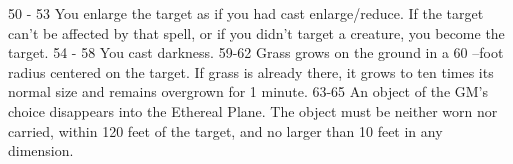 50 - 53                                           You enlarge the target as if you  had cast  enlarge/reduce. If the target can't be affected by  that spell, or if you didn't target a creature, you  become the target.                                                                                                                                                                                                                                                                                                                                                                                                                                                 
54 - 58                                           You cast darkness.                                                                                                                                                                                                                                                                                                                                                                                                                                                                                                                                                                                                      
59-62                                             Grass grows on the ground in a 60 --foot radius  centered on the target. If grass is already  there,  it grows to ten times its normal size and remains  overgrown for 1 minute.                                                                                                                                                                                                                                                                                                                                                                                                                                        
63-65                                             An object of the GM's choice disappears into the  Ethereal Plane. The object must be neither worn  nor carried, within 120 feet of the target, and no  larger than 10 feet  in any dimension.                                                                                                                                                                                                                                                                                                                                                                                                                           
